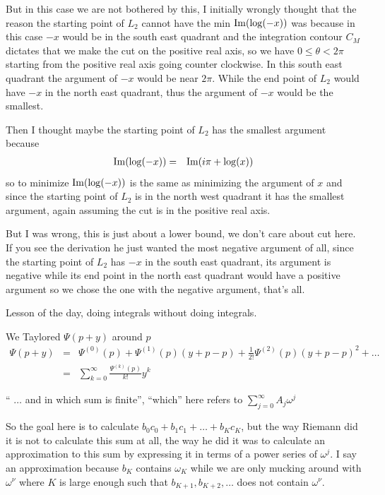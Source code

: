 \documentclass[aps,preprint,preprintnumbers,nofootinbib,showpacs,prd]{revtex4-1}
\newcommand{\nbea}{\begin{eqnarray*}}
\newcommand{\neea}{\end{eqnarray*}}
\def\Im{{\rm Im}}
\begin{document}
But in this case we are not bothered by this, I initially wrongly thought that the reason the starting point of $L_2$ cannot have the min $\Im(\log(-x))$ was because in this case $-x$ would be in the south east quadrant and the integration contour $C_M$ dictates that we make the cut on the positive real axis, so we have $0 \le \theta < 2\pi$ starting from the positive real axis going counter clockwise. In this south east quadrant the argument of $-x$ would be near $2\pi$. While the end point of $L_2$ would have $-x$ in the north east quadrant, thus the argument of $-x$ would be the smallest.

Then I thought maybe the starting point of $L_2$ has the smallest argument because
%
\nbea
\Im{(\log(-x))} & = & \Im{(i\pi + \log(x))}
\neea
%
so to minimize $\Im(\log(-x))$ is the same as minimizing the argument of $x$ and since the starting point of $L_2$ is in the north west quadrant it has the smallest argument, again assuming the cut is in the positive real axis.

But I was wrong, this is just about a lower bound, we don't care about cut here. If you see the derivation he just wanted the most negative argument of all, since the starting point of $L_2$ has $-x$ in the south east quadrant, its argument is negative while its end point in the north east quadrant would have a positive argument so we chose the one with the negative argument, that's all.










Lesson of the day, doing integrals without doing integrals.


We Taylored $\Psi(p+y)$ around $p$
%
\nbea
\Psi(p+y) & = & \Psi^{(0)}(p) + \Psi^{(1)}(p) (y+p - p) + \frac{1}{2!}\Psi^{(2)}(p) (y+p - p)^2 + \dots \\
& = & \sum_{k=0}^\infty \frac{\Psi^{(k)}(p)}{k!} y^k
\neea
%




`` $\dots$ and in which sum is finite'', ``which'' here refers to $\sum_{j=0}^\infty A_j \omega^j$


So the goal here is to calculate $b_0 c_0 + b_1 c_1 + \dots + b_Kc_K$, but the way Riemann did it is not to calculate this sum at all, the way he did it was to calculate an approximation to this sum by expressing it in terms of a power series of $\omega^j$. I say an approximation because $b_K$ contains $\omega_K$ while we are only mucking around with $\omega^\nu$ where $K$ is large enough such that $b_{K+1}, b_{K+2}, \dots$ does not contain $\omega^\nu$.
\end{document}
